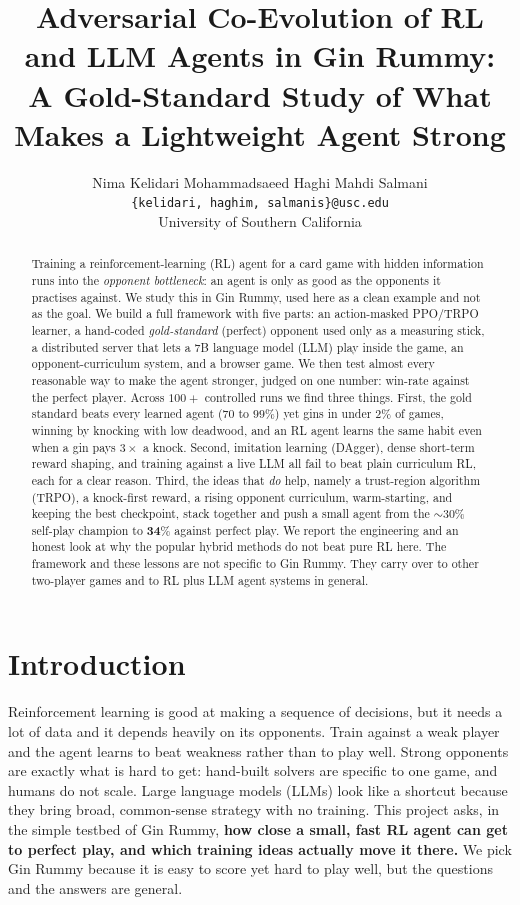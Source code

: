 \documentclass[10pt]{article}
\title{Adversarial Co-Evolution of RL and LLM Agents in Gin Rummy:\\
       A Gold-Standard Study of What Makes a Lightweight Agent Strong}
\author{Nima Kelidari \quad Mohammadsaeed Haghi \quad Mahdi Salmani \\
  \texttt{\{kelidari, haghim, salmanis\}@usc.edu} \\
  University of Southern California}
\date{}
\begin{document}
\maketitle

\begin{abstract}
Training a reinforcement-learning (RL) agent for a card game with hidden information runs into the
\emph{opponent bottleneck}: an agent is only as good as the opponents it practises against. We study
this in Gin Rummy, used here as a clean example and not as the goal. We build a full framework with
five parts: an action-masked PPO/TRPO learner, a hand-coded \emph{gold-standard} (perfect) opponent
used only as a measuring stick, a distributed server that lets a 7B language model (LLM) play inside
the game, an opponent-curriculum system, and a browser game. We then test almost every reasonable
way to make the agent stronger, judged on one number: win-rate against the perfect player. Across
$100+$ controlled runs we find three things. First, the gold standard beats every learned agent
($70$ to $99\%$) yet gins in under $2\%$ of games, winning by knocking with low deadwood, and an RL
agent learns the same habit even when a gin pays $3\times$ a knock. Second, imitation learning
(DAgger), dense short-term reward shaping, and training against a live LLM all fail to beat plain
curriculum RL, each for a clear reason. Third, the ideas that \emph{do} help, namely a trust-region
algorithm (TRPO), a knock-first reward, a rising opponent curriculum, warm-starting, and keeping the
best checkpoint, stack together and push a small agent from the $\sim\!30\%$ self-play champion to
$\mathbf{34\%}$ against perfect play. We report the engineering and an honest look at why the popular
hybrid methods do not beat pure RL here. The framework and these lessons are not specific to Gin
Rummy. They carry over to other two-player games and to RL plus LLM agent systems in general.
\end{abstract}

\section{Introduction}
Reinforcement learning is good at making a sequence of decisions, but it needs a lot of data and it
depends heavily on its opponents. Train against a weak player and the agent learns to beat weakness
rather than to play well. Strong opponents are exactly what is hard to get: hand-built solvers are
specific to one game, and humans do not scale. Large language models (LLMs) look like a shortcut
because they bring broad, common-sense strategy with no training. This project asks, in the simple
testbed of Gin Rummy, \textbf{how close a small, fast RL agent can get to perfect play, and which
training ideas actually move it there.} We pick Gin Rummy because it is easy to score yet hard to
play well, but the questions and the answers are general.
\end{document}
